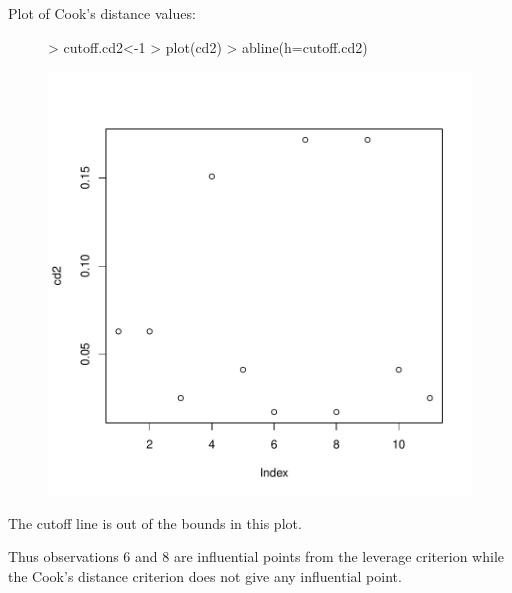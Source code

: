 \documentclass[12pt]{article}
\begin{document}
\begin{itemize}
Plot of Cook's distance values:
\begin{figure}[H]
\begin{Schunk}
\begin{Sinput}
> cutoff.cd2<-1
> plot(cd2)
> abline(h=cutoff.cd2)
\end{Sinput}
\end{Schunk}
\includegraphics{HW6-018}
\end{figure}
The cutoff line is out of the bounds in this plot.

Thus observations 6 and 8 are influential points from the leverage criterion while the Cook's distance criterion does not give any influential point.

\clearpage


\end{itemize}
\end{document}
